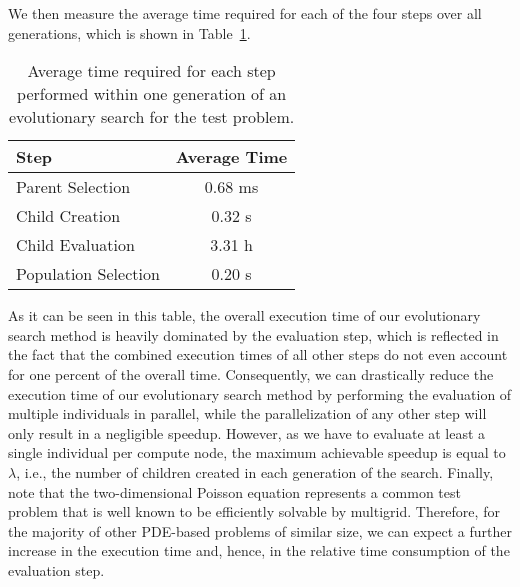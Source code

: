We then measure the average time required for each of the four steps over all generations, which is shown in Table~\ref{table:evolutionary-search-profiling}.
\begin{table}
	\caption{Average time required for each step performed within one generation of an evolutionary search for the test problem.}
	\label{table:evolutionary-search-profiling}
	\centering
	\begin{tabular}{l c}
		\toprule
		Step & Average Time \\
		\midrule
		Parent Selection & 0.68 ms \\
		\midrule
		Child Creation  & 0.32 s \\
		\midrule
		Child Evaluation  & 3.31 h \\
		\midrule
		Population Selection  & 0.20 s \\
		\bottomrule
	\end{tabular}
\end{table}
As it can be seen in this table, the overall execution time of our evolutionary search method is heavily dominated by the evaluation step, which is reflected in the fact that the combined execution times of all other steps do not even account for one percent of the overall time.
Consequently, we can drastically reduce the execution time of our evolutionary search method by performing the evaluation of multiple individuals in parallel, while the parallelization of any other step will only result in a negligible speedup. 
However, as we have to evaluate at least a single individual per compute node, the maximum achievable speedup is equal to $\lambda$, i.e., the number of children created in each generation of the search.
Finally, note that the two-dimensional Poisson equation represents a common test problem that is well known to be efficiently solvable by multigrid.
Therefore, for the majority of other PDE-based problems of similar size, we can expect a further increase in the execution time and, hence, in the relative time consumption of the evaluation step.

